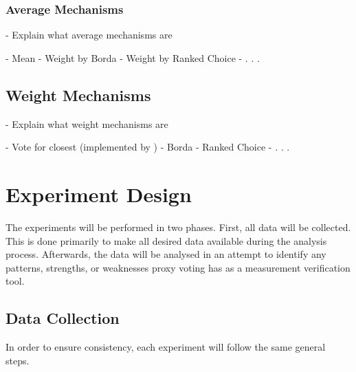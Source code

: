 \subsubsection{Average Mechanisms}\label{subsubsec:average-mechanisms}
- Explain what average mechanisms are

- Mean
- Weight by Borda
- Weight by Ranked Choice
- . . .

\subsection{Weight Mechanisms}\label{subsec:weight-mechanisms}
- Explain what weight mechanisms are

- Vote for closest (implemented by \cite{Cohensius2017})
- Borda
- Ranked Choice
- . . .


\section{Experiment Design}\label{sec:experiment-design}
%
%

The experiments will be performed in two phases.
First, all data will be collected.
This is done primarily to make all desired data available during the analysis
process.
Afterwards, the data will be analysed in an attempt to identify any patterns,
strengths, or weaknesses proxy voting has as a measurement verification tool.

\subsection{Data Collection}\label{subsec:data-collection}
In order to ensure consistency, each experiment will follow the same general
steps.

